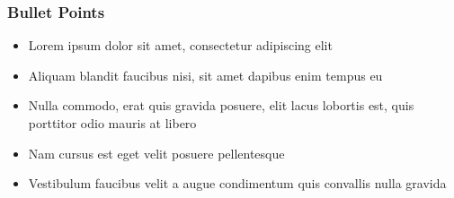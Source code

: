 % 
% 
% 
\begin{frame}
	\frametitle{Bullet Points}
	\begin{itemize}
	\item Lorem ipsum dolor sit amet, consectetur adipiscing elit
	\item Aliquam blandit faucibus nisi, sit amet dapibus enim tempus eu
	\item Nulla commodo, erat quis gravida posuere, elit lacus lobortis est, quis porttitor odio mauris at libero
	\item Nam cursus est eget velit posuere pellentesque
	\item Vestibulum faucibus velit a augue condimentum quis convallis nulla gravida
	\end{itemize}
\end{frame}
% 
% 

